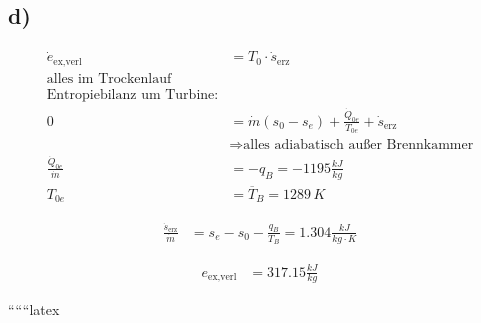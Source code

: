

\subsection*{d)}

\begin{align*}
\dot{e}_{\text{ex,verl}} &= T_0 \cdot \dot{s}_{\text{erz}} \\
\text{alles im Trockenlauf} \\
\text{Entropiebilanz um Turbine:} \\
0 &= \dot{m} \left( s_0 - s_e \right) + \frac{\dot{Q}_{0e}}{T_{0e}} + \dot{s}_{\text{erz}} \\
&\Rightarrow \text{alles adiabatisch außer Brennkammer} \\
\frac{\dot{Q}_{0e}}{\dot{m}} &= -q_B = -1195 \frac{kJ}{kg} \\
T_{0e} &= \overline{T}_B = 1289 \, K
\end{align*}

\begin{align*}
\frac{\dot{s}_{\text{erz}}}{\dot{m}} &= s_e - s_0 - \frac{q_B}{T_B} = 1.304 \frac{kJ}{kg \cdot K}
\end{align*}

\begin{align*}
e_{\text{ex,verl}} &= 317.15 \frac{kJ}{kg}
\end{align*}

``````latex
